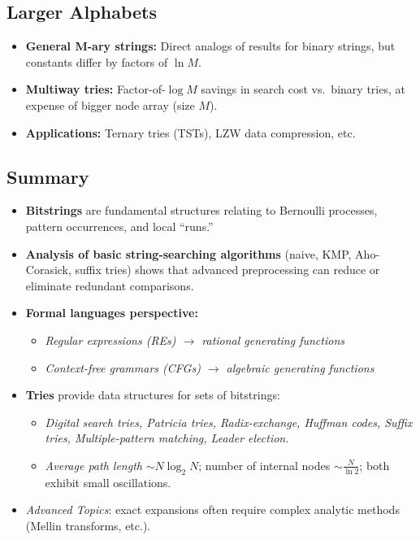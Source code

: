 \documentclass[11pt,letterpaper]{article}
\begin{document}
\subsection{Larger Alphabets}
\begin{itemize}
  \item \textbf{General M-ary strings:} Direct analogs of results for binary strings, but constants differ by factors of $\ln M$.
  \item \textbf{Multiway tries:} Factor-of-$\log M$ savings in search cost vs.\ binary tries, at expense of bigger node array (size $M$).
  \item \textbf{Applications:} Ternary tries (TSTs), LZW data compression, etc.
\end{itemize}

\subsection{Summary}
\begin{itemize}
  \item \textbf{Bitstrings} are fundamental structures relating to Bernoulli processes, pattern occurrences, and local ``runs.''
  \item \textbf{Analysis of basic string-searching algorithms} (naive, KMP, Aho-Corasick, suffix tries) shows that advanced preprocessing can reduce or eliminate redundant comparisons.
  \item \textbf{Formal languages perspective:} 
    \begin{itemize}
      \item \emph{Regular expressions (REs) $\to$ rational generating functions}
      \item \emph{Context-free grammars (CFGs) $\to$ algebraic generating functions}
    \end{itemize}
  \item \textbf{Tries} provide data structures for sets of bitstrings:
    \begin{itemize}
      \item \emph{Digital search tries, Patricia tries, Radix-exchange, Huffman codes, Suffix tries, Multiple-pattern matching, Leader election.}
      \item \emph{Average path length} $\sim N \log_2 N$; number of internal nodes $\sim \frac{N}{\ln 2}$; both exhibit small oscillations.
    \end{itemize}
  \item \emph{Advanced Topics}: exact expansions often require complex analytic methods (Mellin transforms, etc.).
\end{itemize}
\clearpage
\end{document}
